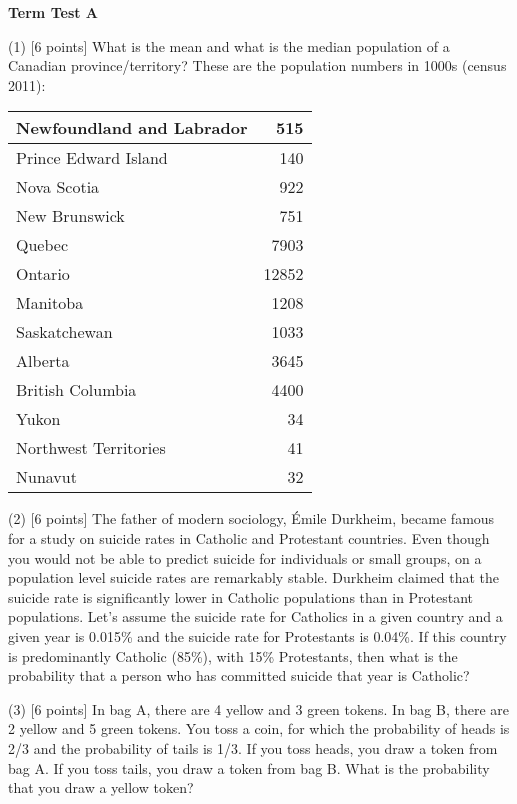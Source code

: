 \documentclass[11pt]{article}
\newcounter{aufg}
\newcommand{\aufgabe}[1]{\refstepcounter{aufg}\textbf{(\arabic{aufg})}
[#1 points]}
\begin{document}
\textbf{Term Test A}

(1) [6 points] What is the mean and what is the median population of a Canadian
province/territory? These are the population numbers in 1000s (census 2011):

\bigskip

\begin{tabular}{|l|r|} \hline
Newfoundland and Labrador & 515   \\ \hline
Prince Edward Island      & 140   \\ \hline
Nova Scotia               & 922   \\ \hline
New Brunswick             & 751   \\ \hline
Quebec                    & 7903  \\ \hline
Ontario                   & 12852 \\ \hline
Manitoba                  & 1208  \\ \hline
Saskatchewan              & 1033  \\ \hline
Alberta                   & 3645  \\ \hline
British Columbia          & 4400  \\ \hline
Yukon                     & 34    \\ \hline
Northwest Territories     & 41    \\ \hline
Nunavut                   & 32    \\ \hline
\end{tabular}

\bigskip

(2) [6 points] The father of modern sociology, {\'E}mile Durkheim,
became famous for a study on suicide rates in Catholic and Protestant
countries. Even though you would not be able to predict suicide for
individuals or small groups, on a population level suicide rates are
remarkably stable. Durkheim claimed that the suicide rate is
significantly lower in Catholic populations than in Protestant
populations. Let's assume the suicide rate for Catholics in a given
country and a given year is 0.015\% and the suicide rate for
Protestants is 0.04\%. If this country is predominantly Catholic
(85\%), with 15\% Protestants, then what is the probability that a
person who has committed suicide that year is Catholic?

\newpage

(3) [6 points] In bag A, there are 4 yellow and 3 green tokens. In bag
B, there are 2 yellow and 5 green tokens. You toss a coin, for which
the probability of heads is 2/3 and the probability of tails is 1/3.
If you toss heads, you draw a token from bag A. If you toss tails, you
draw a token from bag B. What is the probability that you draw a
yellow token?
\end{document}
